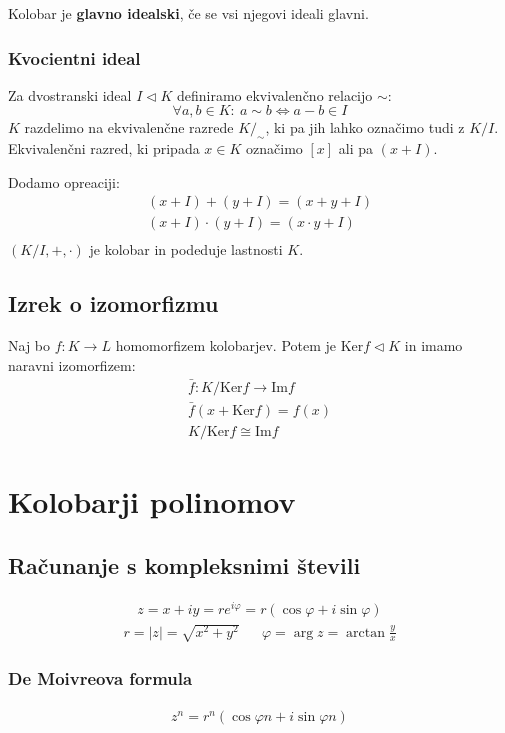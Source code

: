 	Kolobar je \textbf{glavno idealski}, če se vsi njegovi ideali glavni.

	\subsubsection*{Kvocientni ideal}
	Za dvostranski ideal $I \lhd K$ definiramo ekvivalenčno relacijo $\sim$:
	\[ \forall a,b \in K:\ a \sim b \iff a-b \in I \]
	$K$ razdelimo na ekvivalenčne razrede $K/_\sim$, ki pa jih lahko označimo tudi z $K/I$. Ekvivalenčni razred, ki pripada $x \in K$ označimo $[x]$ ali pa $(x+I)$.

	Dodamo opreaciji:
	\begin{align*}
		(x+I) + (y + I) = (x+y+I) \\
		(x+I) \cdot (y + I) = (x\cdot y+I) \\
	\end{align*}
	$(K/I, +, \cdot)$ je kolobar in podeduje lastnosti $K$.

	\subsection*{Izrek o izomorfizmu}
	Naj bo $f: K \to L$ homomorfizem kolobarjev. Potem je $\text{Ker}f \lhd K$ in imamo naravni izomorfizem:
	\begin{align*}
		\bar{f}: K/\text{Ker}f \to \text{Im}f\\
		\bar{f} (x + \text{Ker}f) = f(x) \\
		K/\text{Ker}f \cong \text{Im}f
	\end{align*}

	\section*{Kolobarji polinomov}
	\subsection*{Računanje s kompleksnimi števili}
	\begin{gather*}
		z = x + iy = r e^{i\varphi} = r\left( \cos \varphi + i \sin \varphi \right)
	\end{gather*}
	\begin{align*}
		r = |z| = \sqrt{x^2 + y^2} && \varphi = \arg z = \arctan \frac{y}{x}
	\end{align*}

	\subsubsection*{De Moivreova formula}
	\begin{align*}
		z^n = r^n\left( \cos \varphi n + i \sin \varphi n \right)
	\end{align*}

